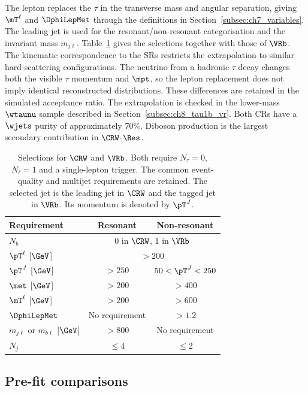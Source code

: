 The lepton replaces the $\tau$ in the transverse mass and angular separation, giving $\mT^\ell$ and $\DphiLepMet$ through the definitions in Section~\ref{subsec:ch7_variables}.
The leading jet is used for the resonant/non-resonant categorisation and the invariant mass $m_{j\ell}$.
Table~\ref{tab:ch8_wcr_vrw} gives the selections together with those of $\VRb$.
The kinematic correspondence to the SRs restricts the extrapolation to similar hard-scattering configurations.
The neutrino from a hadronic $\tau$ decay changes both the visible $\tau$ momentum and $\mpt$, so the lepton replacement does not imply identical reconstructed distributions.
These differences are retained in the simulated acceptance ratio.
The extrapolation is checked in the lower-mass $\wtaunu$ sample described in Section~\ref{subsec:ch8_tau1b_vr}.
Both CRs have a $\wjets$ purity of approximately $70\%$.
Diboson production is the largest secondary contribution in $\CRW$-$\Res$.

\begin{table}[htbp]
    \centering
    \small
    \caption{Selections for $\CRW$ and $\VRb$. Both require $N_\tau=0$, $N_\ell=1$ and a single-lepton trigger. The common event-quality and multijet requirements are retained. The selected jet is the leading jet in $\CRW$ and the tagged jet in $\VRb$. Its momentum is denoted by $\pT^J$.}
    \label{tab:ch8_wcr_vrw}
    \begin{tabular}{lcc}
        \toprule
        Requirement & Resonant & Non-resonant \\
        \midrule
        $N_b$ & \multicolumn{2}{c}{0 in $\CRW$, 1 in $\VRb$} \\
        $\pT^\ell$ [$\GeV$] & \multicolumn{2}{c}{$>200$} \\
        $\pT^J$ [$\GeV$] & $>250$ & $50<\pT^J<250$ \\
        $\met$ [$\GeV$] & $>200$ & $>400$ \\
        $\mT^\ell$ [$\GeV$] & $>200$ & $>600$ \\
        $\DphiLepMet$ & No requirement & $>1.2$ \\
        $m_{j\ell}$ or $m_{b\ell}$ [$\GeV$] & $>800$ & No requirement \\
        $N_j$ & $\leq4$ & $\leq2$ \\
        \bottomrule
    \end{tabular}
\end{table}

\subsection{Pre-fit comparisons}
\label{subsec:ch8_wcr_prefit}

